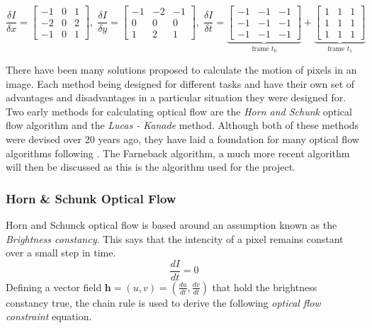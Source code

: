 \documentclass{UoNMCHA}
\numberwithin{equation}{section}
\begin{document}
\begin{equation}\label{eq:ImageKernals}
	\frac{\delta I}{\delta x} = 
	\begin{bmatrix}
		-1 &0 &1\\
		-2 &0 &2\\
		-1 &0 &1
	\end{bmatrix},\;
	\frac{\delta I}{\delta y} = 
	\begin{bmatrix}
		-1 & -2 &-1\\
		0 & 0 & 0\\
		1 & 2 & 1
	\end{bmatrix},\;
	\frac{\delta I}{\delta t} = \underbrace{
	\begin{bmatrix}
		-1 & -1 & -1\\
		-1 & -1 & -1\\
		-1 & -1 & -1
	\end{bmatrix}}_\text{{frame $t_{0}$}} + \underbrace{
	\begin{bmatrix}
		1 & 1 & 1\\
		1 & 1 & 1\\
		1 & 1 & 1
	\end{bmatrix}}_\text{{frame $t_{1}$}}
\end{equation}

There have been many solutions proposed to calculate the motion of pixels in an image. Each method being designed for different tasks and have their own set of advantages and disadvantages in a particular situation they were designed for. Two early methods for calculating optical flow are the \textit{Horn and Schunk} optical flow algorithm and the \textit{Lucas - Kanade} method. Although both of these methods were devised over 20 years ago, they have laid a foundation for many optical flow algorithms following \citep{sun2010secrets}. The Farneback algorithm, a much more recent algorithm will then be discussed as this is the algorithm used for the project.

\subsubsection{Horn \& Schunk Optical Flow}\label{sec:HornSchunk}
Horn and Schunck optical flow is based around an assumption known as the \textit{Brightness constancy}. This says that the intencity of a pixel remains constant over a small step in time.
\begin{equation}
	\frac{dI}{dt} = 0
\end{equation}
Defining a vector field $\mathbf{h} = (u, v) = \left(\frac{du}{dt}, \frac{dv}{dt}\right)$ that hold the brightness constancy true, the chain rule is used to derive the following \textit{optical flow constraint} equation.
\end{document}
